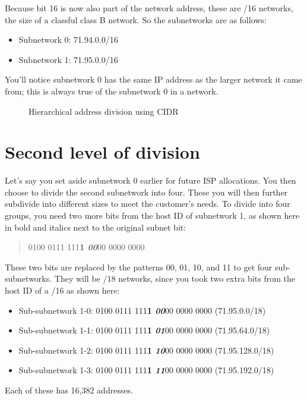 Because bit 16 is now also part of the network address, these are /16 networks, the size of a classful class B network.
So the subnetworks are as follows:
\begin{itemize}
   \item Subnetwork 0: 71.94.0.0/16
   \item Subnetwork 1: 71.95.0.0/16
\end{itemize}
You'll notice subnetwork 0 has the same IP address as the larger network it came from; this is always true of the subnetwork 0 in a network.


\begin{figure}
   \centering
   \caption{Hierarchical address division using CIDR}
   \label{fig:cidr-hierarchical-division}
\end{figure}


\section{Second level of division}

Let's say you set aside subnetwork 0 earlier for future ISP allocations.
You then choose to divide the second subnetwork into four.
These you will then further subdivide into different sizes to meet the customer's needs.
To divide into four groups, you need two more bits from the host ID of subnetwork 1, as shown here in bold and italics next to the original subnet bit:
\begin{quote}
0100 0111 111\textbf{1 \textit{00}}00 0000 0000
\end{quote}

These two bits are replaced by the patterns 00, 01, 10, and 11 to get four sub-subnetworks.
They will be /18 networks, since you took two extra bits from the host ID of a /16 as shown here:
\begin{itemize}
   \item Sub-subnetwork 1-0: 0100 0111 111\textbf{1 \textit{00}}00 0000 0000 (71.95.0.0/18)
   \item Sub-subnetwork 1-1: 0100 0111 111\textbf{1 \textit{01}}00 0000 0000 (71.95.64.0/18)
   \item Sub-subnetwork 1-2: 0100 0111 111\textbf{1 \textit{10}}00 0000 0000 (71.95.128.0/18)
   \item Sub-subnetwork 1-3: 0100 0111 111\textbf{1 \textit{11}}00 0000 0000 (71.95.192.0/18)
\end{itemize}
Each of these has 16,382 addresses.




